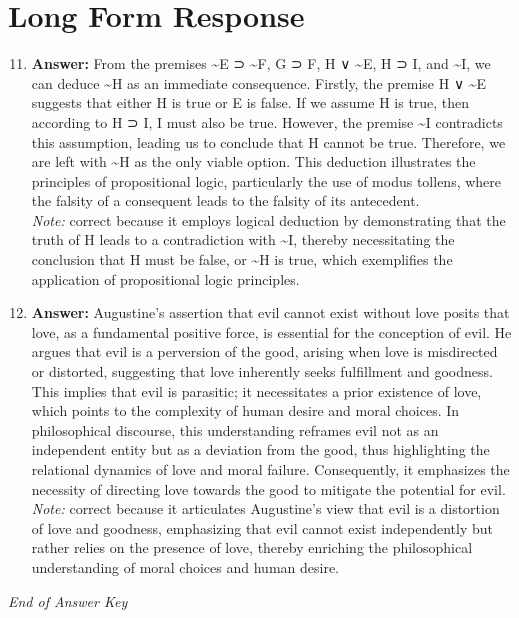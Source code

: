 \documentclass[12pt]{article}
\begin{document}
\section*{Long Form Response}
\begin{enumerate}[label=\arabic*.]
\setcounter{enumi}{10}
\item \textbf{Answer:} From the premises \textasciitilde{}E ⊃ \textasciitilde{}F, G ⊃ F, H ∨ \textasciitilde{}E, H ⊃ I, and \textasciitilde{}I, we can deduce \textasciitilde{}H as an immediate consequence. Firstly, the premise H ∨ \textasciitilde{}E suggests that either H is true or E is false. If we assume H is true, then according to H ⊃ I, I must also be true. However, the premise \textasciitilde{}I contradicts this assumption, leading us to conclude that H cannot be true. Therefore, we are left with \textasciitilde{}H as the only viable option. This deduction illustrates the principles of propositional logic, particularly the use of modus tollens, where the falsity of a consequent leads to the falsity of its antecedent.
\\ \textit{Note:} correct because it employs logical deduction by demonstrating that the truth of H leads to a contradiction with \textasciitilde{}I, thereby necessitating the conclusion that H must be false, or \textasciitilde{}H is true, which exemplifies the application of propositional logic principles.
\item \textbf{Answer:} Augustine's assertion that evil cannot exist without love posits that love, as a fundamental positive force, is essential for the conception of evil. He argues that evil is a perversion of the good, arising when love is misdirected or distorted, suggesting that love inherently seeks fulfillment and goodness. This implies that evil is parasitic; it necessitates a prior existence of love, which points to the complexity of human desire and moral choices. In philosophical discourse, this understanding reframes evil not as an independent entity but as a deviation from the good, thus highlighting the relational dynamics of love and moral failure. Consequently, it emphasizes the necessity of directing love towards the good to mitigate the potential for evil.
\\ \textit{Note:} correct because it articulates Augustine's view that evil is a distortion of love and goodness, emphasizing that evil cannot exist independently but rather relies on the presence of love, thereby enriching the philosophical understanding of moral choices and human desire.
\end{enumerate}

\vfill
\noindent\textit{End of Answer Key}
\end{document}
